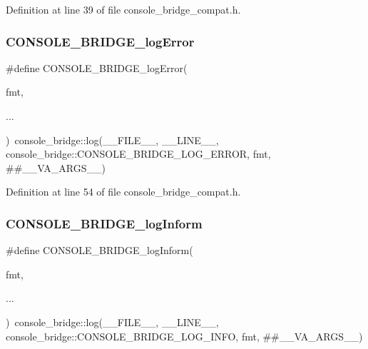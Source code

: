 Definition at line 39 of file console\+\_\+bridge\+\_\+compat.\+h.

\mbox{\label{group__mavconn_ga78bfb8423a8c11242fba38b8b3952aa7}} 
\subsubsection{\texorpdfstring{CONSOLE\_BRIDGE\_logError}{CONSOLE\_BRIDGE\_logError}}
{\footnotesize\ttfamily \#define C\+O\+N\+S\+O\+L\+E\+\_\+\+B\+R\+I\+D\+G\+E\+\_\+log\+Error(\begin{DoxyParamCaption}\item[{}]{fmt,  }\item[{}]{... }\end{DoxyParamCaption})~console\+\_\+bridge\+::log(\+\_\+\+\_\+\+F\+I\+L\+E\+\_\+\+\_\+, \+\_\+\+\_\+\+L\+I\+N\+E\+\_\+\+\_\+, console\+\_\+bridge\+::\+C\+O\+N\+S\+O\+L\+E\+\_\+\+B\+R\+I\+D\+G\+E\+\_\+\+L\+O\+G\+\_\+\+E\+R\+R\+OR, fmt, \#\#\+\_\+\+\_\+\+V\+A\+\_\+\+A\+R\+G\+S\+\_\+\+\_\+)}



Definition at line 54 of file console\+\_\+bridge\+\_\+compat.\+h.

\mbox{\label{group__mavconn_gaa587fd17781bdf24e813cb3c43eb8ff2}} 
\subsubsection{\texorpdfstring{CONSOLE\_BRIDGE\_logInform}{CONSOLE\_BRIDGE\_logInform}}
{\footnotesize\ttfamily \#define C\+O\+N\+S\+O\+L\+E\+\_\+\+B\+R\+I\+D\+G\+E\+\_\+log\+Inform(\begin{DoxyParamCaption}\item[{}]{fmt,  }\item[{}]{... }\end{DoxyParamCaption})~console\+\_\+bridge\+::log(\+\_\+\+\_\+\+F\+I\+L\+E\+\_\+\+\_\+, \+\_\+\+\_\+\+L\+I\+N\+E\+\_\+\+\_\+, console\+\_\+bridge\+::\+C\+O\+N\+S\+O\+L\+E\+\_\+\+B\+R\+I\+D\+G\+E\+\_\+\+L\+O\+G\+\_\+\+I\+N\+FO, fmt, \#\#\+\_\+\+\_\+\+V\+A\+\_\+\+A\+R\+G\+S\+\_\+\+\_\+)}



